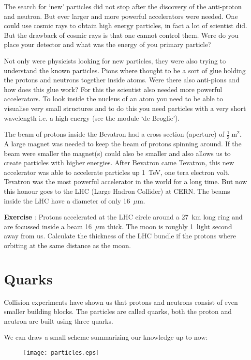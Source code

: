 The search for `new' particles did not stop after the discovery of the anti-proton and neutron. But ever larger and more powerful accelerators were needed. One could use cosmic rays to obtain high energy particles, in fact a lot of scientist did. But the drawback of cosmic rays is that one cannot control them. Were do you place your detector and what was the energy of you primary particle?

Not only were physicists looking for new particles, they were also trying to understand the known particles. Pions where thought to be a sort of glue holding the protons and neutrons together inside atoms. Were there also anti-pions and how does this glue work? For this the scientist also needed more powerful accelerators. To look inside the nucleus of an atom you need to be able to visualise very small structures and to do this you need particles with a very short wavelength i.e. a high energy (see the module `de Broglie').

The beam of protons inside the Bevatron had a cross section (aperture) of $\frac{1}{3}~\mbox{m}^2$. A large magnet was needed to keep the beam of protons spinning around. If the beam were smaller the magnet(s) could also be smaller and also allows us to create particles with higher energies. After Bevatron came Tevatron, this new accelerator was able to accelerate particles up 1~TeV, one tera electron volt. Tevatron was the most powerful accelerator in the world for a long time. But now this honour goes to the LHC (Large Hadron Collider) at CERN. The beams inside the LHC have a diameter of only 16~$\mu$m.

\begin{shaded}
\textbf{Exercise \theExercise {}} : Protons accelerated at the LHC circle around a 27~km long ring and are focussed inside a beam 16~$\mu$m thick. The moon is roughly 1~light second away from us. Calculate the thickness of the LHC bundle if the protons where orbiting at the same distance as the moon.  \end{shaded}

\section{Quarks}
Collision experiments have shown us that protons and neutrons consist of even smaller building blocks. The particles are called quarks, both the proton and neutron are built using three quarks.

We can draw a small scheme summarizing our knowledge up to now:
\begin{figure}[h]\begin{center}
\texttt{[image: particles.eps]}
\label{fig:particles}
\end{center}\end{figure}


